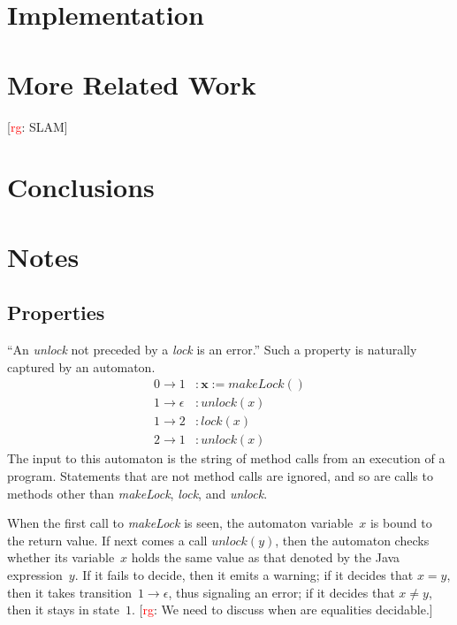 \documentclass[a4paper]{article}
\newcommand{\rg}[1]{\todo{rg}{#1}}
\newcommand{\todo}[2]{{\small [\textcolor{red}{#1}: #2]}}
\theoremstyle{slanted}
\theoremstyle{definition}
\theoremstyle{remark}
\begin{document}
\section{Implementation}

\section{More Related Work}

\rg{SLAM}
\section{Conclusions}
\section{Notes}

\subsection{Properties}\label{sec:properties} %

``An \textit{unlock} not preceded by a \textit{lock} is an error.''
Such a property is naturally captured by an automaton.
\begin{equation}\label{eq:unlockunlock}
\begin{aligned}
0\to1&: \mathbf{x} := \mathit{makeLock}()\\
1\to\epsilon&: \mathit{unlock}(x)\\
1\to2&: \mathit{lock}(x)\\
2\to1&: \mathit{unlock}(x)
\end{aligned}
\end{equation}
The input to this automaton is the string of method calls from an execution of a program.
Statements that are not method calls are ignored, and so are calls to methods other than \textit{makeLock}, \textit{lock}, and \textit{unlock}.

When the first call to \textit{makeLock} is seen, the automaton variable~$x$ is bound to the return value.
If next comes a call $\mathit{unlock}(y)$, then the automaton checks whether its variable~$x$ holds the same value as that denoted by the Java expression~$y$.
If it fails to decide, then it emits a warning; if it decides that $x=y$, then it takes transition~$1\to\epsilon$, thus signaling an error; if it decides that $x\ne y$, then it stays in state~$1$.
\rg{We need to discuss when are equalities decidable.}
\end{document}
